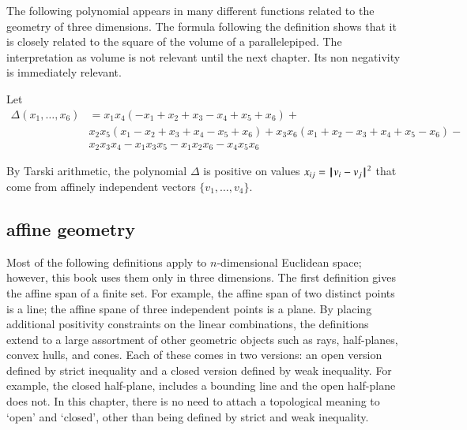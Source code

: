The following polynomial appears in many different functions related to the geometry of three dimensions.  The formula following the definition shows that it is closely related to the square of the volume of a parallelepiped.  The interpretation as  volume is not relevant until the next chapter.  Its non negativity is immediately relevant. 

\begin{definition}[$\Delta$]\label{def:delta}  Let 
$$
\begin{array}{lll}
\Delta(x_1,\ldots,x_6) &= x_1 x_4 (- x_1+x_2+x_3- x_4+x_5+x_6)+\\&
            x_2 x_5 (x_1- x_2+x_3+x_4- x_5+x_6)
            +x_3 x_6 (x_1+x_2- x_3+x_4+x_5- x_6)
            - \\&x_2 x_3 x_4- x_1 x_3 x_5- x_1 x_2 x_6- x_4 x_5 x_6
\end{array}
$$
\end{definition}

By Tarski arithmetic, %
the polynomial $\Delta$ is positive on values $x_{ij}={\hskip0.1em|\hskip-0.15em|\hskip0.1em}v_i - v_j{\hskip0.1em|\hskip-0.15em|\hskip0.1em}^2$
that come from affinely independent vectors $\{v_1,\ldots,v_4\}$.





\subsection{affine geometry}




Most of the following definitions apply to $n$-dimensional
Euclidean space; however, this book uses them only in
three dimensions.  The first definition 
gives the affine span of a finite set.  For example,
the affine span of two distinct points is a line;
the affine spane of three independent points is a plane.
By placing additional
positivity constraints on the linear combinations, the definitions
extend to a large assortment of other geometric objects
such as rays, half-planes, convex hulls, and cones.  
Each of these comes in two versions: an open version
defined by strict inequality and a closed version defined
by weak inequality.  For example, the closed half-plane,
includes a bounding line and the open half-plane does
not.  In this chapter, there is no need
to attach a topological meaning to `open' and `closed',
other than being defined by strict and weak inequality.


